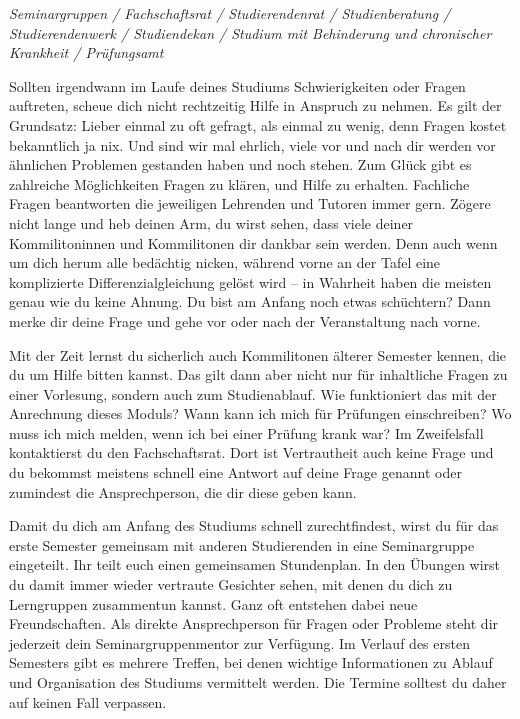 
\textit{Seminargruppen / Fachschaftsrat / Studierendenrat / Studienberatung / Studierendenwerk / Studiendekan / Studium mit Behinderung und chronischer Krankheit / Prüfungsamt}

Sollten irgendwann im Laufe deines Studiums Schwierigkeiten oder Fragen auftreten, scheue dich nicht rechtzeitig Hilfe in Anspruch zu nehmen.
Es gilt der Grundsatz: Lieber einmal zu oft gefragt, als einmal zu wenig, denn Fragen kostet bekanntlich ja nix. Und sind wir mal ehrlich, viele vor und nach dir werden vor ähnlichen Problemen gestanden haben und noch stehen.
Zum Glück gibt es zahlreiche Möglichkeiten Fragen zu klären, und Hilfe zu erhalten.
Fachliche Fragen beantworten die jeweiligen Lehrenden und Tutoren immer gern. Zögere nicht lange und heb deinen Arm, du wirst sehen, dass viele deiner Kommilitoninnen und Kommilitonen dir dankbar sein werden. Denn auch wenn um dich herum alle bedächtig nicken, während vorne an der Tafel eine komplizierte Differenzialgleichung gelöst wird -- in Wahrheit haben die meisten genau wie du keine Ahnung.
Du bist am Anfang noch etwas schüchtern? Dann merke dir deine Frage und gehe vor oder nach der Veranstaltung nach vorne.

Mit der Zeit lernst du sicherlich auch Kommilitonen älterer Semester kennen, die du um Hilfe bitten kannst. 
Das gilt dann aber nicht nur für inhaltliche Fragen zu einer Vorlesung, sondern auch zum Studienablauf.
Wie funktioniert das mit der Anrechnung dieses Moduls? Wann kann ich mich für Prüfungen einschreiben? Wo muss ich mich melden, wenn ich bei einer Prüfung krank war? Im Zweifelsfall kontaktierst du den Fachschaftsrat. Dort ist Vertrautheit auch keine Frage und du bekommst meistens schnell eine Antwort auf deine Frage genannt oder zumindest die Ansprechperson, die dir diese geben kann.

\label{sec:seminargruppen}
Damit du dich am Anfang des Studiums schnell zurechtfindest, wirst du für das erste Semester gemeinsam mit anderen Studierenden in eine Seminargruppe eingeteilt.
Ihr teilt euch einen gemeinsamen Stundenplan.
In den Übungen wirst du damit immer wieder vertraute Gesichter sehen, mit denen du dich zu Lerngruppen zusammentun kannst.
Ganz oft entstehen dabei neue Freundschaften.
Als direkte Ansprechperson für Fragen oder Probleme steht dir jederzeit dein Seminargruppenmentor zur Verfügung.
Im Verlauf des ersten Semesters gibt es mehrere Treffen, bei denen wichtige Informationen zu Ablauf und Organisation des Studiums vermittelt werden. Die Termine solltest du daher auf keinen Fall verpassen.

